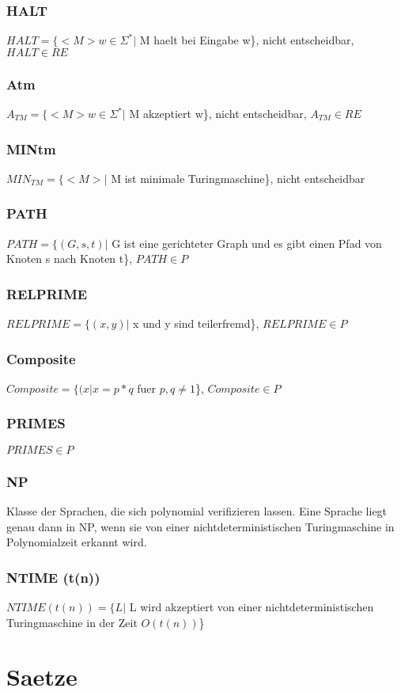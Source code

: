 \documentclass[a4paper]{scrreprt}
\begin{document}
\subsubsection{HALT} $HALT = \{<M> w \in \Sigma^*|$ M haelt bei Eingabe w\}, nicht entscheidbar, $HALT \in RE$
\subsubsection{Atm} $A_{TM} = \{<M> w \in \Sigma^*|$ M akzeptiert w\}, nicht entscheidbar, $A_{TM} \in RE$
\subsubsection{MINtm} $MIN_{TM} = \{<M>|$ M ist minimale Turingmaschine\}, nicht entscheidbar
\subsubsection{PATH} $PATH = \{(G, s, t)|$ G ist eine gerichteter Graph und es gibt einen Pfad von Knoten s nach Knoten t\}, $PATH \in P$
\subsubsection{RELPRIME} $RELPRIME = \{(x, y)|$ x und y sind teilerfremd\}, $RELPRIME \in P$
\subsubsection{Composite} $Composite = \{(x|x = p * q$ fuer $p,q \neq 1$\}, $Composite \in P$
\subsubsection{PRIMES} $PRIMES \in P$
\subsubsection{NP} Klasse der Sprachen, die sich polynomial verifizieren lassen. Eine Sprache liegt genau dann in NP, wenn sie von einer nichtdeterministischen Turingmaschine in Polynomialzeit erkannt wird.
\subsubsection{NTIME (t(n))} $NTIME (t(n)) = \{L|$ L wird akzeptiert von einer nichtdeterministischen Turingmaschine in der Zeit $O(t(n))$\}



\section{Saetze}
\end{document}

